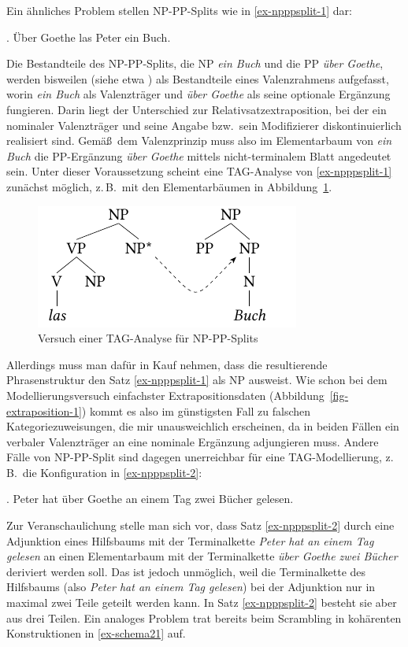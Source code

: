 Ein ähnliches Problem stellen NP-PP-Splits wie in \ref{ex-npppsplit-1} dar:

\ex. \label{ex-npppsplit-1} Über Goethe las Peter ein Buch. 

Die Bestandteile des NP-PP-Splits, die NP {\it ein Buch} und die PP {\it über Goethe}, werden bisweilen (siehe etwa \citealt{DeKuthy:02}) als Bestandteile eines Valenzrahmens aufgefasst, worin {\it ein Buch} als Valenzträger und {\it über Goethe} als seine optionale Ergänzung fungieren. Darin liegt der Unterschied zur Relativsatzextraposition, bei der ein nominaler Valenzträger und seine  Angabe bzw.\ sein Modifizierer diskontinuierlich realisiert sind. Gemä\ss\ dem Valenzprinzip muss also im Elementarbaum von {\it ein Buch} die PP-Ergänzung {\it über Goethe} mittels nicht-terminalem Blatt angedeutet sein. Unter dieser Voraussetzung scheint eine TAG-Analyse von \ref{ex-npppsplit-1} zunächst möglich, z.\,B.\ mit den Elementarbäumen in Abbildung~\ref{fig-npppsplit-1}.
\begin{figure}[t]
\centering
\includegraphics{graphics/abb519.pdf}
\caption{\label{fig-npppsplit-1}Versuch einer TAG-Analyse für NP-PP-Splits}
\end{figure}
Allerdings muss man dafür in Kauf nehmen, dass die resultierende Phrasenstruktur den Satz \ref{ex-npppsplit-1} als NP ausweist. Wie schon bei dem Modellierungsversuch einfachster Extrapositionsdaten (Abbildung~\ref{fig-extraposition-1}) kommt es also im günstigsten Fall zu falschen Kategoriezuweisungen, die mir unausweichlich erscheinen, da in beiden Fällen ein verbaler Valenzträger an eine nominale Ergänzung adjungieren muss. Andere Fälle von NP-PP-Split sind dagegen unerreichbar für eine TAG-Modellierung, z.\,B.\ die Konfiguration in \ref{ex-npppsplit-2}: 

\ex. \label{ex-npppsplit-2} Peter hat über Goethe an einem Tag zwei Bücher gelesen.

\largerpage%
Zur Veranschaulichung stelle man sich vor, dass Satz \ref{ex-npppsplit-2}  durch eine Adjunktion eines Hilfsbaums mit der Terminalkette  {\it Peter hat an einem Tag gelesen} an einen Elementarbaum mit der Terminalkette {\it über Goethe zwei Bücher} deriviert werden soll. Das ist jedoch unmöglich, weil die Terminalkette des Hilfsbaums (also {\it Peter hat an einem Tag gelesen}) bei der Adjunktion nur in maximal zwei Teile geteilt werden kann. In Satz \ref{ex-npppsplit-2} besteht sie aber aus drei Teilen. Ein analoges Problem trat bereits beim Scrambling in kohärenten Konstruktionen in \ref{ex-schema21} auf.
\largerpage%

